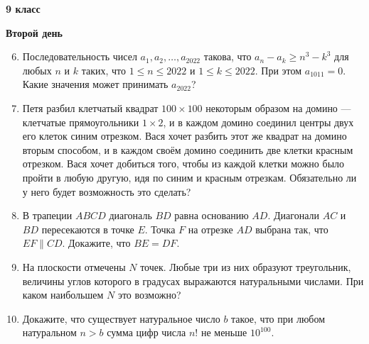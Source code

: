 \documentclass{article}
\begin{document}
    \begin{center}
        \LARGE\textbf{9 класс}
    \end{center}
    \begin{center}
        \large\textbf{Второй день}
    \end{center}


    \begin{enumerate}[label*=9.{\arabic{enumi}}]
        \setcounter{enumi}{5}

        \item Последовательность чисел $a_1, a_2, \dotsc , a_{2022}$ такова, что $a_n - a_k \geqslant n^3 - k^3$ для любых $n$ и $k$ таких, что $1 \leqslant n \leqslant 2022$ и $1 \leqslant k \leqslant 2022$.
        При этом $a_{1011} = 0$.
        Какие значения может принимать $a_{2022}$?

        \item  Петя разбил клетчатый квадрат $100 \times 100$ некоторым образом на домино — клетчатые прямоугольники $1 \times 2$, и в каждом домино соединил центры двух его клеток синим отрезком.
        Вася хочет разбить этот же квадрат на домино вторым способом, и в каждом своём домино соединить две клетки красным отрезком.
        Вася хочет добиться того, чтобы из каждой клетки можно было пройти в любую другую, идя по синим и красным отрезкам.
        Обязательно ли у него будет возможность это сделать?

        \item  В трапеции $ABCD$ диагональ $BD$ равна основанию $AD$.
        Диагонали $AC$ и $BD$ пересекаются в точке $E$.
        Точка $F$ на отрезке $AD$ выбрана так, что $EF \parallel CD$.
        Докажите, что $BE = DF$.

        \item На плоскости отмечены $N$ точек.
        Любые три из них образуют треугольник, величины углов которого в градусах выражаются натуральными числами.
        При каком наибольшем $N$ это возможно?

        \item Докажите, что существует натуральное число $b$ такое, что при любом натуральном $n > b$ сумма цифр числа $n!$ не меньше $10^{100}$.

    \end{enumerate}
\end{document}
